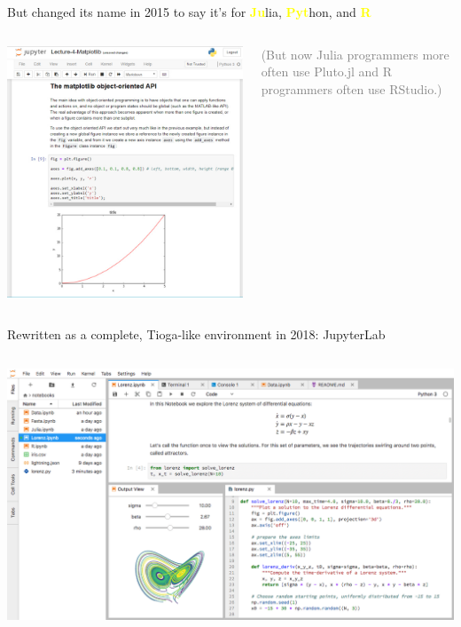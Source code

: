 \documentclass[aspectratio=169]{beamer}
\begin{document}
\begin{frame}{But changed its name in 2015 to say it's for \textcolor{yellow}{\bf Ju}lia, \textcolor{yellow}{\bf Pyt}hon, and \textcolor{yellow}{\bf R}}
\vspace{0.2 cm}
\begin{columns}
\includegraphics[width=\linewidth]{../img/screenshot-2015-jupyter-notebook.png}

\Large
\textcolor{gray}{(But now Julia programmers more often use Pluto.jl and R programmers often use RStudio.)}
\end{columns}
\end{frame}

\begin{frame}{Rewritten as a complete, Tioga-like environment in 2018: JupyterLab}
\vspace{0.2 cm}
\begin{columns}
\includegraphics[width=\linewidth]{../img/screenshot-2018-jupyterlab.png}
\end{columns}
\end{frame}
\end{document}

